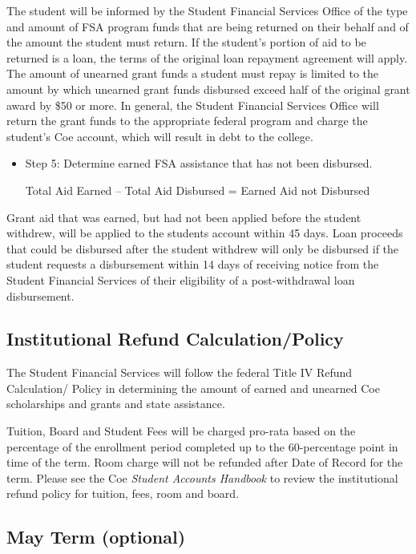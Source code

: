 \documentclass[
  letterpaper,
]{scrbook}
\begin{document}
The student will be informed by the Student Financial Services Office of
the type and amount of FSA program funds that are being returned on
their behalf and of the amount the student must return. If the student's
portion of aid to be returned is a loan, the terms of the original loan
repayment agreement will apply. The amount of unearned grant funds a
student must repay is limited to the amount by which unearned grant
funds disbursed exceed half of the original grant award by \$50 or more.
In general, the Student Financial Services Office will return the grant
funds to the appropriate federal program and charge the student's Coe
account, which will result in debt to the college.

\begin{itemize}
\item
  Step 5: Determine earned FSA assistance that has not been disbursed.

  Total Aid Earned -- Total Aid Disbursed = Earned Aid not Disbursed
\end{itemize}

Grant aid that was earned, but had not been applied before the student
withdrew, will be applied to the students account within 45 days. Loan
proceeds that could be disbursed after the student withdrew will only be
disbursed if the student requests a disbursement within 14 days of
receiving notice from the Student Financial Services of their
eligibility of a post-withdrawal loan disbursement.

\hypertarget{institutional-refund-calculationpolicy}{%
\subsection{Institutional Refund
Calculation/Policy}\label{institutional-refund-calculationpolicy}}

The Student Financial Services will follow the federal Title IV Refund
Calculation/ Policy in determining the amount of earned and unearned Coe
scholarships and grants and state assistance.

Tuition, Board and Student Fees will be charged pro-rata based on the
percentage of the enrollment period completed up to the 60-percentage
point in time of the term. Room charge will not be refunded after Date
of Record for the term. Please see the Coe \emph{Student Accounts
Handbook} to review the institutional refund policy for tuition, fees,
room and board.

\hypertarget{may-term-optional-1}{%
\subsection{May Term (optional)}\label{may-term-optional-1}}
\end{document}
